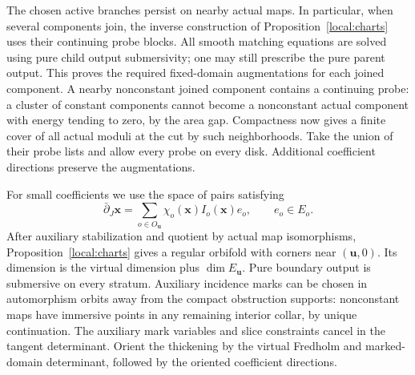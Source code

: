 The chosen active branches persist on nearby actual maps.  In particular,
when several components join, the inverse construction of
Proposition~\ref{local:charts} uses their continuing probe blocks.  All smooth
matching equations are solved using pure child output submersivity;
one may still prescribe the pure parent output.  This proves the
required fixed-domain augmentations for each joined component.  A nearby
nonconstant joined component contains a continuing probe: a cluster of
constant components cannot become a nonconstant actual component with
energy tending to zero, by the area gap.  Compactness now gives a finite
cover of all actual moduli at the cut by such neighborhoods.  Take the
union of their probe lists and allow every probe on every disk.
Additional coefficient directions preserve the augmentations.

For small coefficients we use the space of pairs satisfying
\begin{equation}\label{virt:thickening}
 \bar\partial_J\mathbf x
   =\sum_{o\in O_{\mathbf u}}
        \chi_o(\mathbf x)I_o(\mathbf x)e_o,
 \qquad e_o\in E_o.
\end{equation}
After auxiliary stabilization and quotient by actual map isomorphisms,
Proposition~\ref{local:charts} gives a regular orbifold with corners near
$(\mathbf u,0)$.  Its dimension is the virtual dimension plus
$\dim E_{\mathbf u}$.  Pure boundary output is submersive on every
stratum.  Auxiliary incidence marks can be chosen in automorphism orbits
away from the compact obstruction supports: nonconstant maps have
immersive points in any remaining interior collar, by unique
continuation.  The auxiliary mark variables and slice constraints cancel
in the tangent determinant.  Orient the thickening by the virtual
Fredholm and marked-domain determinant, followed by the oriented
coefficient directions.

